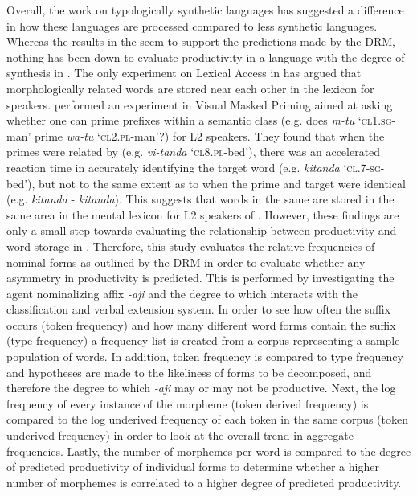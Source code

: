 \documentclass[output=paper,modfonts]{langscibook}
\begin{document}
Overall, the work on typologically synthetic languages has suggested a difference in how these languages are processed compared to less synthetic languages. Whereas the results in the  seem to support the predictions made by the DRM, nothing has been down to evaluate productivity in a language with the degree of synthesis in . The only experiment on Lexical Access in  has argued that morphologically related words are stored near each other in the lexicon for  speakers. \citet{FooteEtAl2014} performed an experiment in Visual Masked Priming aimed at asking whether one can prime  prefixes within a semantic class (e.g. does \textit{m-tu} ‘\textsc{cl1}.\textsc{sg}-man’ prime \textit{wa-tu} ‘\textsc{cl2}.\textsc{pl}-man’?) for L2  speakers. They found that when the primes were related by  (e.g. \textit{vi-tanda} ‘\textsc{cl8}.\textsc{pl}-bed’), there was an accelerated reaction time in accurately identifying the target word (e.g. \textit{kitanda} ‘\textsc{cl}.7-\textsc{sg}-bed’), but not to the same extent as to when the prime and target were identical (e.g. \textit{kitanda} - \textit{kitanda}). This suggests that words in the same  are stored in the same area in the mental lexicon for L2 speakers of . However, these findings are only a small step towards evaluating the relationship between productivity and word storage in . Therefore, this study evaluates the relative frequencies of nominal forms as outlined by the DRM in order to evaluate whether any asymmetry in productivity is predicted. This is performed by investigating the agent nominalizing affix \textit{-aji} and the degree to which   interacts with the  classification and verbal extension system. In order to see how often the suffix occurs (token frequency) and how many different word forms contain the suffix (type frequency) a frequency list is created from a corpus representing a sample population of  words. In addition, token frequency is compared to type frequency and hypotheses are made to the likeliness of forms to be decomposed, and therefore the degree to which \textit{-aji} may or may not be productive. Next, the log frequency of every instance of the morpheme (token derived frequency) is compared to the log underived frequency of each token in the same corpus (token underived frequency) in order to look at the overall trend in aggregate frequencies. Lastly, the number of morphemes per word is compared to the degree of predicted productivity of individual forms to determine whether a higher number of morphemes is correlated to a higher degree of predicted productivity.
\end{document}
